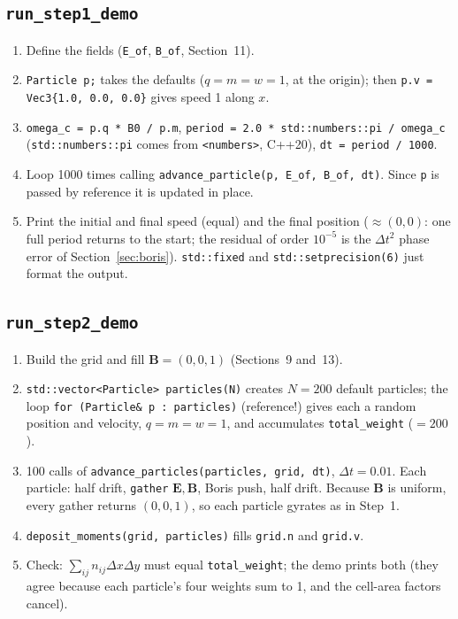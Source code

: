 \documentclass[11pt,a4paper]{article}
\newcommand{\EE}{\mathbf{E}}
\newcommand{\BB}{\mathbf{B}}
\begin{document}
\subsection{\texttt{run\_step1\_demo}}
\begin{enumerate}
  \item Define the fields (\texttt{E\_of}, \texttt{B\_of}, Section~11).
  \item \lstinline|Particle p;| takes the defaults ($q=m=w=1$, at the origin); then
        \lstinline|p.v = Vec3{1.0, 0.0, 0.0}| gives speed 1 along $x$.
  \item \lstinline|omega_c = p.q * B0 / p.m|, \lstinline|period = 2.0 * std::numbers::pi / omega_c|
        (\texttt{std::numbers::pi} comes from \texttt{<numbers>}, C++20), \lstinline|dt = period / 1000|.
  \item Loop 1000 times calling \lstinline|advance_particle(p, E_of, B_of, dt)|. Since \texttt{p} is passed by
        reference it is updated in place.
  \item Print the initial and final speed (equal) and the final position ($\approx(0,0)$: one full period
        returns to the start; the residual of order $10^{-5}$ is the $\Delta t^2$ phase error of
        Section~\ref{sec:boris}). \lstinline|std::fixed| and \lstinline|std::setprecision(6)| just format the output.
\end{enumerate}

\subsection{\texttt{run\_step2\_demo}}
\begin{enumerate}
  \item Build the grid and fill $\BB=(0,0,1)$ (Sections~9 and~13).
  \item \lstinline|std::vector<Particle> particles(N)| creates $N=200$ default particles; the loop
        \lstinline|for (Particle& p : particles)| (reference!) gives each a random position and velocity,
        $q=m=w=1$, and accumulates \texttt{total\_weight} ($=200$).
  \item 100 calls of \lstinline|advance_particles(particles, grid, dt)|, $\Delta t=0.01$. Each particle:
        half drift, \texttt{gather} $\EE,\BB$, Boris push, half drift. Because $\BB$ is uniform, every gather
        returns $(0,0,1)$, so each particle gyrates as in Step~1.
  \item \lstinline|deposit_moments(grid, particles)| fills \texttt{grid.n} and \texttt{grid.v}.
  \item Check: $\sum_{ij}n_{ij}\Delta x\Delta y$ must equal \texttt{total\_weight}; the demo prints both
        (they agree because each particle's four weights sum to 1, and the cell-area factors cancel).
\end{enumerate}
\end{document}
